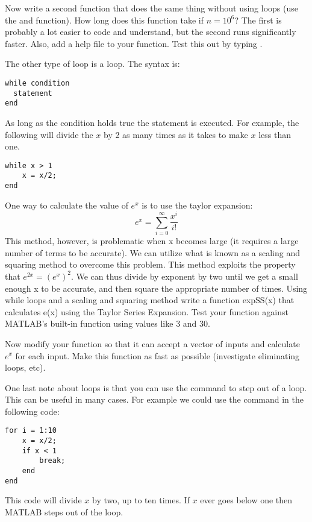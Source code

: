 \begin{problem}
Now write a second function that does the same thing without using loops (use the  and  function). How long does this function take if $n = 10^6$? The first is probably a lot easier to code and understand, but the second runs significantly faster.
Also, add a help file to your function. Test this out by typing .
\end{problem}

The other type of loop is a  loop. The syntax is:

\begin{lstlisting}[style=matlab]
while condition
  statement
end
\end{lstlisting}

As long as the condition holds true the statement is executed. For example, the following will divide the $x$ by 2 as many times as it takes to make $x$ less than one.

\begin{lstlisting}[style=matlab]
while x > 1
    x = x/2;
end
\end{lstlisting}

\begin{problem}
One way to calculate the value of $e^x$ is to use the taylor expansion:
\[
e^x = \sum_{i=0}^\infty{\frac{x^i}{i!}}
\]
This method, however, is problematic when x becomes large (it requires a large number of terms to be accurate). We can utilize what is known as a scaling and squaring method to overcome this problem. This method exploits the property that $e^{2x} = (e^x)^2$. We can thus divide by exponent by two until we get a small enough x to be accurate, and then square the appropriate number of times.
Using while loops and a scaling and squaring method write a function expSS(x) that calculates e(x) using the Taylor Series Expansion. Test your function against MATLAB's built-in function using values like 3 and 30.
\end{problem}

\begin{problem}
Now modify your function so that it can accept a vector of inputs and calculate $e^x$ for each input. Make this function as fast as possible (investigate eliminating loops, etc).
\end{problem}

One last note about loops is that you can use the  command to step out of a loop. This can be useful in many cases. For example we could use the  command in the following code:

\begin{lstlisting}[style=matlab]
for i = 1:10
    x = x/2;
    if x < 1
        break;
    end
end
\end{lstlisting}

This code will divide $x$ by two, up to ten times. If $x$ ever goes below one then MATLAB steps out of the loop.
